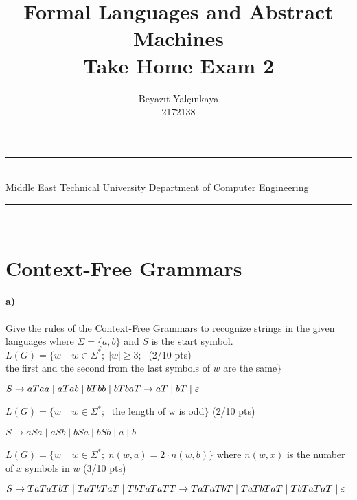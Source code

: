 \documentclass[a4paper,12pt]{article}
\title{Formal Languages and Abstract Machines \\ Take Home Exam 2}
\author{Beyazıt Yalçınkaya \\ 2172138} %
\date{} %
\newcommand{\HRule}{\rule{\linewidth}{1mm}}
\begin{document}
\HRule\\
Middle East Technical University \hfill Department of Computer Engineering
{\let\newpage\relax\maketitle}
\HRule\\
\vspace{1cm}


\section{Context-Free Grammars \hfill {}}

\paragraph{a)} Give the rules of the Context-Free Grammars to recognize strings in the given languages where $\Sigma=\{a,b\}$ and $S$ is the start symbol. \\  

$L(G)=\{w \mid \;  w \in \Sigma^*;\; |w| \geq 3;\; $  \hfill \small{(2/10 pts)} \\
\hspace*{22mm} the first and the second from the last symbols of $w$ are the same$\}$ \\

\begin{tcolorbox}
$
S \rightarrow aTaa \mid aTab \mid bTbb \mid bTba \\
T \rightarrow aT \mid bT \mid \varepsilon
$
\end{tcolorbox}


$L(G)=\{w \mid \;  w \in \Sigma^*;\; $ the length of w is odd$\}$ \hfill \small{(2/10 pts)} \\

\begin{tcolorbox}
$
S \rightarrow aSa \mid aSb \mid bSa \mid bSb \mid a \mid b
$
\end{tcolorbox}


$L(G)=\{w \mid \;  w \in \Sigma^*;\; n(w,a)=2\cdot n(w,b)\}$ where $n(w,x)$ is the number of $x$ symbols in $w$ \hfill \small{(3/10 pts)} \\

\begin{tcolorbox}
$
S \rightarrow TaTaTbT \mid TaTbTaT \mid TbTaTaT \\
T \rightarrow TaTaTbT \mid TaTbTaT \mid TbTaTaT \mid \varepsilon
$
\end{tcolorbox}
\end{document}
